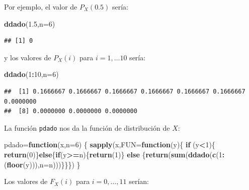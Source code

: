 \documentclass[]{book}
\newenvironment{Shaded}{\begin{snugshade}}{\end{snugshade}}
\newcommand{\ControlFlowTok}[1]{\textcolor[rgb]{0.13,0.29,0.53}{\textbf{#1}}}
\newcommand{\DataTypeTok}[1]{\textcolor[rgb]{0.13,0.29,0.53}{#1}}
\newcommand{\DecValTok}[1]{\textcolor[rgb]{0.00,0.00,0.81}{#1}}
\newcommand{\FloatTok}[1]{\textcolor[rgb]{0.00,0.00,0.81}{#1}}
\newcommand{\KeywordTok}[1]{\textcolor[rgb]{0.13,0.29,0.53}{\textbf{#1}}}
\newcommand{\NormalTok}[1]{#1}
\newcommand{\OperatorTok}[1]{\textcolor[rgb]{0.81,0.36,0.00}{\textbf{#1}}}
\begin{document}
Por ejemplo, el valor de \(P_X(0.5)\) sería:

\begin{Shaded}
\begin{Highlighting}[]
\KeywordTok{ddado}\NormalTok{(}\FloatTok{1.5}\NormalTok{,}\DataTypeTok{n=}\DecValTok{6}\NormalTok{)}
\end{Highlighting}
\end{Shaded}

\begin{verbatim}
## [1] 0
\end{verbatim}

y los valores de \(P_X(i)\) para \(i=1,\ldots 10\) sería:

\begin{Shaded}
\begin{Highlighting}[]
\KeywordTok{ddado}\NormalTok{(}\DecValTok{1}\OperatorTok{:}\DecValTok{10}\NormalTok{,}\DataTypeTok{n=}\DecValTok{6}\NormalTok{)}
\end{Highlighting}
\end{Shaded}

\begin{verbatim}
##  [1] 0.1666667 0.1666667 0.1666667 0.1666667 0.1666667 0.1666667 0.0000000
##  [8] 0.0000000 0.0000000 0.0000000
\end{verbatim}

La función \texttt{pdado} nos da la función de distribución de \(X\):

\begin{Shaded}
\begin{Highlighting}[]
\NormalTok{pdado=}\ControlFlowTok{function}\NormalTok{(x,}\DataTypeTok{n=}\DecValTok{6}\NormalTok{) }
\NormalTok{  \{}
  \KeywordTok{sapply}\NormalTok{(x,}\DataTypeTok{FUN=}\ControlFlowTok{function}\NormalTok{(y)\{ }\ControlFlowTok{if}\NormalTok{ (y}\OperatorTok{<}\DecValTok{1}\NormalTok{)\{ }\KeywordTok{return}\NormalTok{(}\DecValTok{0}\NormalTok{)\}}\ControlFlowTok{else}\NormalTok{\{}\ControlFlowTok{if}\NormalTok{(y}\OperatorTok{>=}\NormalTok{n)\{}\KeywordTok{return}\NormalTok{(}\DecValTok{1}\NormalTok{)\} }\ControlFlowTok{else}
\NormalTok{  \{}\KeywordTok{return}\NormalTok{(}\KeywordTok{sum}\NormalTok{(}\KeywordTok{ddado}\NormalTok{(}\KeywordTok{c}\NormalTok{(}\DecValTok{1}\OperatorTok{:}\NormalTok{(}\KeywordTok{floor}\NormalTok{(y))),}\DataTypeTok{n=}\NormalTok{n)))\}\}\})}
\NormalTok{  \}}
\end{Highlighting}
\end{Shaded}

Los valores de \(F_X(i)\) para \(i=0,\ldots, 11\) serían:
\end{document}
